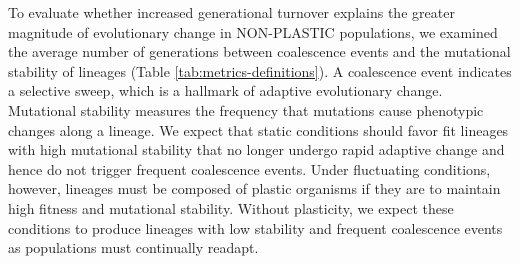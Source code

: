 To evaluate whether increased generational turnover explains the greater magnitude of evolutionary change in NON-PLASTIC populations, we examined the average number of generations between coalescence events and the mutational stability of lineages (Table \ref{tab:metrics-definitions}).
A coalescence event indicates a selective sweep, which is a hallmark of adaptive evolutionary change.
Mutational stability measures the frequency that mutations cause phenotypic changes along a lineage.
We expect that static conditions should favor fit lineages with high mutational stability that no longer undergo rapid adaptive change and hence do not trigger frequent coalescence events.
Under fluctuating conditions, however, lineages must be composed of plastic organisms if they are to maintain high fitness and mutational stability.
Without plasticity, we expect these conditions to produce lineages with low stability and frequent coalescence events as populations must continually readapt.



